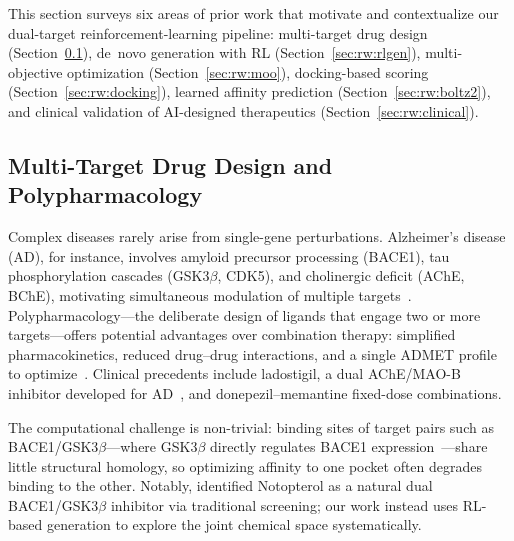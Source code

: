 
This section surveys six areas of prior work that motivate and contextualize our
dual-target reinforcement-learning pipeline: multi-target drug design
(Section~\ref{sec:rw:mtdd}), de~novo generation with RL
(Section~\ref{sec:rw:rlgen}), multi-objective optimization
(Section~\ref{sec:rw:moo}), docking-based scoring
(Section~\ref{sec:rw:docking}), learned affinity prediction
(Section~\ref{sec:rw:boltz2}), and clinical validation of AI-designed
therapeutics (Section~\ref{sec:rw:clinical}).

\subsection{Multi-Target Drug Design and Polypharmacology}
\label{sec:rw:mtdd}

Complex diseases rarely arise from single-gene perturbations.
Alzheimer's disease (AD), for instance, involves amyloid precursor processing
(BACE1), tau phosphorylation cascades (GSK3$\beta$, CDK5), and
cholinergic deficit (AChE, BChE), motivating simultaneous modulation of
multiple targets~\citep{bolognesi2013polypharmacology}.
Polypharmacology---the deliberate design of ligands that engage two or more
targets---offers potential advantages over combination therapy: simplified
pharmacokinetics, reduced drug--drug interactions, and a single
ADMET profile to optimize~\citep{stern2022multitarget}.
Clinical precedents include ladostigil, a dual AChE/MAO-B inhibitor
developed for AD~\citep{weinreb2012cholinesterase}, and donepezil--memantine
fixed-dose combinations.

The computational challenge is non-trivial: binding sites of target pairs
such as BACE1/GSK3$\beta$---where GSK3$\beta$ directly regulates BACE1
expression~\citep{ly2013gsk3b}---share little structural homology, so
optimizing affinity to one pocket often degrades binding to the other.
Notably, \citet{jiang2020notopterol} identified Notopterol as a natural
dual BACE1/GSK3$\beta$ inhibitor via traditional screening; our work
instead uses RL-based generation to explore the joint chemical space
systematically.

